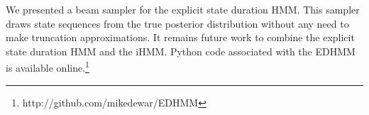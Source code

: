 We presented a beam sampler for the explicit state duration HMM. This sampler draws state sequences from the true posterior distribution without any need to make truncation approximations.
It remains future work to combine the explicit state duration HMM and the iHMM.
Python code associated with the EDHMM is available online.\footnote{http://github.com/mikedewar/EDHMM}

